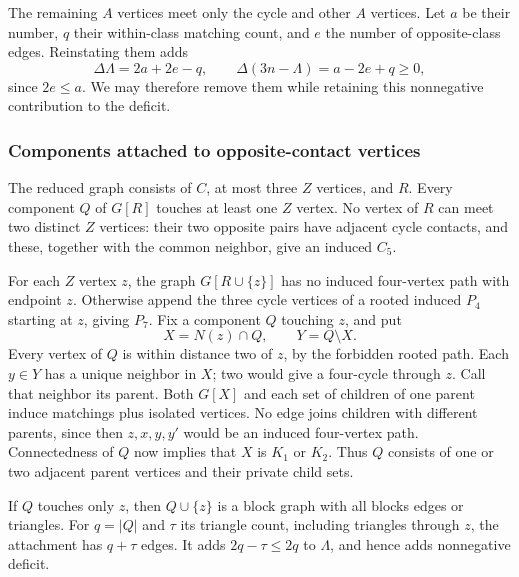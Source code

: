 \documentclass[11pt,a4paper]{article}
\theoremstyle{definition}\newtheorem{definition}[theorem]{Definition}
\theoremstyle{remark}\newtheorem{remark}[theorem]{Remark}
\begin{document}
The remaining $A$ vertices meet only the cycle and other $A$ vertices.
Let $a$ be their number, $q$ their within-class matching count, and $e$
the number of opposite-class edges. Reinstating them adds
\[
 \Delta \Lambda=2a+2e-q,
 \qquad \Delta(3n-\Lambda)=a-2e+q\ge0,
\]
since $2e\le a$. We may therefore remove them while retaining this
nonnegative contribution to the deficit.

\subsubsection{Components attached to opposite-contact vertices}
The reduced graph consists of $C$, at most three $Z$ vertices, and $R$.
Every component $Q$ of $G[R]$ touches at least one $Z$ vertex.
No vertex of $R$ can meet two distinct $Z$ vertices: their two opposite
pairs have adjacent cycle contacts, and these, together with the common
neighbor, give an induced $C_5$.

For each $Z$ vertex $z$, the graph $G[R\cup\{z\}]$ has no induced
four-vertex path with endpoint $z$. Otherwise append the three cycle
vertices of a rooted induced $P_4$ starting at $z$, giving $P_7$.
Fix a component $Q$ touching $z$, and put
\[
 X=N(z)\cap Q,\qquad Y=Q\setminus X.
\]
Every vertex of $Q$ is within distance two of $z$, by the forbidden
rooted path. Each $y\in Y$ has a unique neighbor in $X$; two would give
a four-cycle through $z$. Call that neighbor its parent. Both $G[X]$
and each set of children of one parent induce matchings plus isolated
vertices. No edge joins children with different parents, since then
$z,x,y,y'$ would be an induced four-vertex path. Connectedness of $Q$
now implies that $X$ is $K_1$ or $K_2$. Thus $Q$ consists of one or two
adjacent parent vertices and their private child sets.

If $Q$ touches only $z$, then $Q\cup\{z\}$ is a block graph with all
blocks edges or triangles. For $q=|Q|$ and $\tau$ its triangle count,
including triangles through $z$, the attachment has $q+\tau$ edges.
It adds $2q-\tau\le2q$ to $\Lambda$, and hence adds nonnegative deficit.
\end{document}

